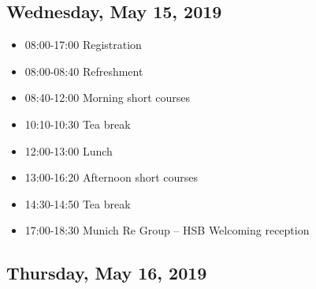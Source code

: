 \documentclass[10pt]{article}
\begin{document}
\subsection*{Wednesday, May 15, 2019}
\begin{itemize}
\item
  08:00-17:00 \hfill Registration
\item
  08:00-08:40 \hfill Refreshment
\item
  08:40-12:00 \hfill Morning short courses
\item
  10:10-10:30 \hfill Tea break
\item 
  12:00-13:00 \hfill Lunch
\item 
  13:00-16:20 \hfill Afternoon short courses
\item 
  14:30-14:50 \hfill Tea break
\item 
  17:00-18:30 \hfill Munich Re Group -- HSB Welcoming reception
\end{itemize}

  





\vfill
\subsection*{Thursday, May 16, 2019}
\end{document}
